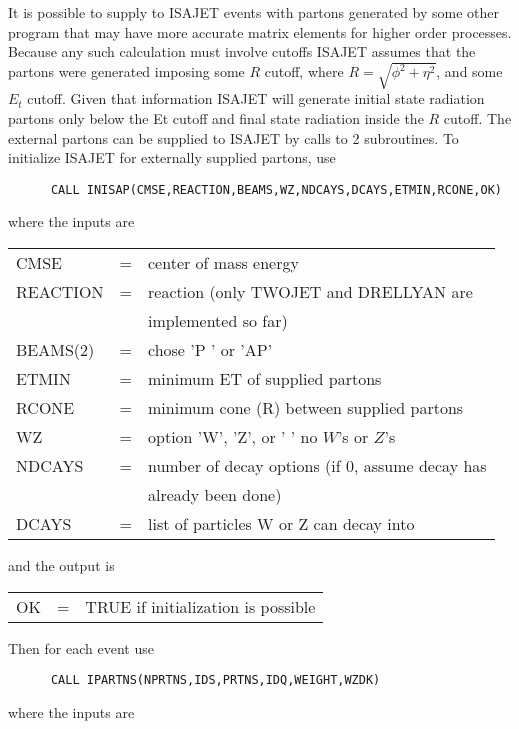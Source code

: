       It is possible to supply to ISAJET events with partons generated
by some other program that may have more accurate matrix elements for
higher order processes. Because any such calculation must involve
cutoffs ISAJET assumes that the partons were generated imposing some
$R$ cutoff, where $R=\sqrt{\phi^2+\eta^2}$, and some $E_t$ cutoff.
Given that information ISAJET will generate initial state radiation
partons only below the Et cutoff and final state radiation inside the
$R$ cutoff. The external partons can be supplied to ISAJET by calls to
2 subroutines. To initialize ISAJET for externally supplied partons,
use
\begin{verbatim}
      CALL INISAP(CMSE,REACTION,BEAMS,WZ,NDCAYS,DCAYS,ETMIN,RCONE,OK)
\end{verbatim}
where the inputs are

\smallskip\noindent
\begin{tabular}{lcl}
      CMSE             &=& center of mass energy\\
      REACTION         &=& reaction (only TWOJET and DRELLYAN are \\
                       && implemented so far)\\
      BEAMS(2)         &=& chose 'P ' or 'AP'\\
      ETMIN            &=& minimum ET of supplied partons\\
      RCONE            &=& minimum cone (R) between supplied partons\\
      WZ               &=& option 'W', 'Z', or ' ' no $W$'s or $Z$'s\\
      NDCAYS           &=& number of decay options (if 0, assume decay has\\
                       &&  already been done)\\
      DCAYS            &=& list of particles W or Z can decay into\\
\end{tabular}
\smallskip

\noindent and the output is

\smallskip\noindent
\begin{tabular}{lcl}
      OK   &=& TRUE if initialization is possible\\
\end{tabular}
\smallskip

\noindent Then for each event use
\begin{verbatim}
      CALL IPARTNS(NPRTNS,IDS,PRTNS,IDQ,WEIGHT,WZDK)
\end{verbatim}
where the inputs are

